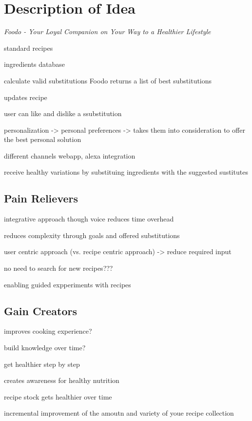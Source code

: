 \chapter{Description of Idea}
\begin{center}
\textit{Foodo - Your Loyal Companion on Your Way to a Healthier Lifestyle}
\end{center}


standard recipes

ingredients database

calculate valid substitutions Foodo returns a list of best substitutions
 
updates recipe 

user can like and dislike a ssubstitution

personalization -> personal preferences -> takes them into consideration to offer the best personal solution

different channels		webapp, alexa integration

receive healthy variations by substituing ingredients with the suggested sustitutes


\section{Pain Relievers}

integrative approach though voice reduces time overhead

reduces complexity through goals and offered substitutions

user centric approach (vs. recipe centric approach) -> reduce required input

no need to search for new recipes???

enabling guided expperiments with recipes

\section{Gain Creators}

improves cooking experience?

build knowledge over time?

get healthier step by step

creates awareness for healthy nutrition

recipe stock gets healthier over time

incremental improvement of the amoutn and variety of youe recipe collection



